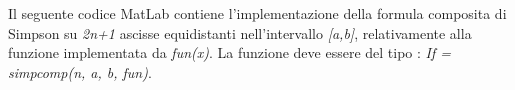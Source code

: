 Il seguente codice MatLab contiene l'implementazione della formula composita di Simpson su \textit{2n+1} ascisse equidistanti nell'intervallo \textit{[a,b]}, relativamente alla funzione implementata da \textit{fun(x)}. La funzione deve essere del tipo : \textit{If = simpcomp(n, a, b, fun)}.\\\
